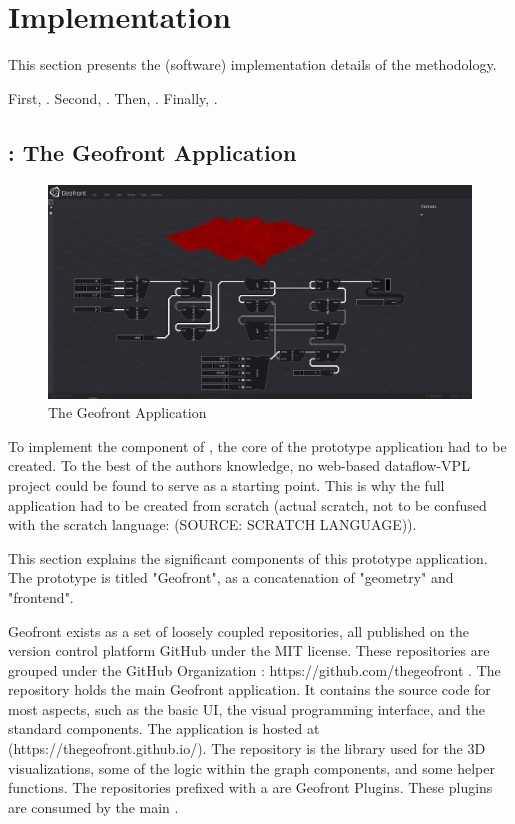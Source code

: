 \chapter{Implementation}%
\label{chap:implementation}
This section presents the (software) implementation details of the methodology.

First, .
Second, .
Then, .
Finally, .

\section{\mySubRQOneTitle: The Geofront Application}

\begin{figure}
  \centering
  \graphicspath{ {../../assets/images/implementation/} }
  \includegraphics[width=\linewidth]{full-application.png}
  \caption[Geofront]{The Geofront Application}
  \label{fig:geofront-app}
\end{figure}

\label{sec:implementation:representation}
To implement the component of \mySubRQOneTitle, the core of the prototype application had to be created.
To the best of the authors knowledge, no web-based dataflow-VPL project could be found to serve as a starting point. 
This is why the full application had to be created from scratch (actual scratch, not to be confused with the scratch language: (SOURCE: SCRATCH LANGUAGE)). 

This section explains the significant components of this prototype application. 
The prototype is titled "Geofront", as a concatenation of "geometry" and "frontend".

Geofront exists as a set of loosely coupled repositories, all published on the version control platform GitHub under the MIT license. These repositories are grouped under the GitHub Organization  : https://github.com/thegeofront .
The  repository holds the main Geofront application. It contains the source code for most aspects, such as the basic UI, the visual programming interface, and the standard components. The application is hosted at (https://thegeofront.github.io/).
The  repository is the library used for the 3D visualizations, some of the logic within the graph components, and some helper functions.
The repositories prefixed with a  are Geofront Plugins. These plugins are consumed by the main .


